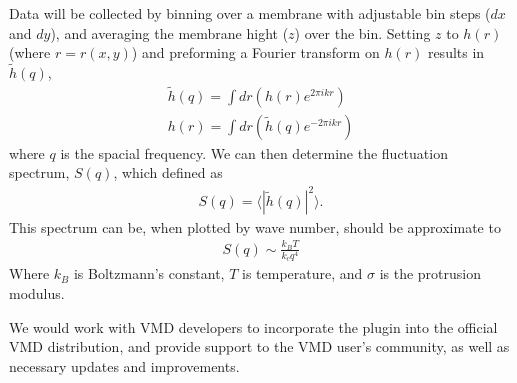 \documentclass{article}
\begin{document}
Data will be collected by binning over a membrane with adjustable bin steps ($dx$ and $dy$), and averaging the membrane hight ($z$) over the bin. Setting $z$ to $h(r)$ (where $r=r(x,y)$) and preforming a Fourier transform on $h(r)$ results in $\tilde{h}(q)$,
	\begin{equation}
		\begin{aligned}
		\tilde{h}(q)=\int dr (h(r) e^{2 \pi i k r})\\
		h(r)=\int dr (\tilde{h}(q) e^{-2 \pi i k r})
		\label{eq:For}
		\end{aligned}
	\end{equation}
where $q$ is the spacial frequency. We can then determine the fluctuation spectrum, $S(q)$, which \cite{Goetz1999} defined as
  \begin{equation}
    \begin{aligned}
      S(q)=\langle|\tilde{h}(q)|^{2}\rangle.
    \end{aligned}
    \label{eq:s1}
  \end{equation}
This spectrum can be, when plotted by wave number, should be approximate to 
  \begin{equation}
    \begin{aligned}
      S(q)\sim\frac{k_BT}{k_c q^4}%
    \end{aligned}
    \label{eq:s2}
  \end{equation}
Where $k_B$ is Boltzmann's constant, $T$ is temperature, and $\sigma$ is the protrusion modulus.

We would work with VMD developers to incorporate the plugin into the official VMD distribution, and provide support to the VMD user’s community, as well as necessary updates and improvements.


\printbibliography
\end{document}
